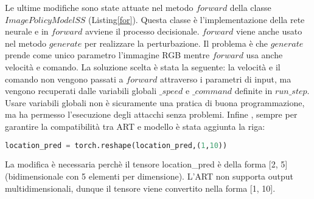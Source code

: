 Le ultime modifiche sono state attuate nel metodo $forward$ della classe $ImagePolicyModelSS$ (Listing\ref{for}). Questa classe è l'implementazione della rete neurale e in $forward$ avviene il processo decisionale.
$forward$ viene anche usato nel metodo $generate$ per realizzare la perturbazione. Il problema è che $generate$ prende come unico parametro l'immagine RGB mentre $forward$ usa anche velocità e comando.
La soluzione scelta è stata la seguente: la velocità e il comando non vengono passati a $forward$ attraverso i  parametri di input, ma vengono recuperati  dalle variabili globali $\_speed$ e $\_command$ definite in $run\_step$. Usare variabili globali
non è sicuramente una pratica di buona programmazione, ma ha permesso l'esecuzione degli attacchi senza problemi. Infine , sempre per garantire la compatibilità tra ART  e modello è stata aggiunta la riga:
\begin{lstlisting}[language=Python]
    location_pred = torch.reshape(location_pred,(1,10))
\end{lstlisting}
La modifica è necessaria perchè il tensore location\_pred è della forma [2, 5] (bidimensionale con 5 elementi per dimensione). L'ART non supporta output multidimensionali, dunque il tensore viene convertito nella forma [1, 10].



